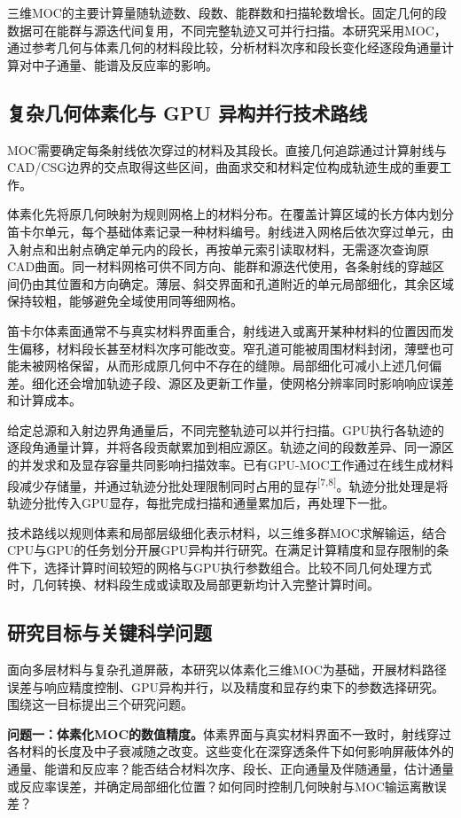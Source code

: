 \documentclass[UTF8, zihao=-4, fontset=none, a4paper]{ctexart}
\newcommand{\upcite}[1]{\textsuperscript{[#1]}}
\begin{document}
三维MOC的主要计算量随轨迹数、段数、能群数和扫描轮数增长。固定几何的段数据可在能群与源迭代间复用，不同完整轨迹又可并行扫描。本研究采用MOC，通过参考几何与体素几何的材料段比较，分析材料次序和段长变化经逐段角通量计算对中子通量、能谱及反应率的影响。

\subsection{复杂几何体素化与 GPU 异构并行技术路线}
MOC需要确定每条射线依次穿过的材料及其段长。直接几何追踪通过计算射线与CAD/CSG边界的交点取得这些区间，曲面求交和材料定位构成轨迹生成的重要工作。

体素化先将原几何映射为规则网格上的材料分布。在覆盖计算区域的长方体内划分笛卡尔单元，每个基础体素记录一种材料编号。射线进入网格后依次穿过单元，由入射点和出射点确定单元内的段长，再按单元索引读取材料，无需逐次查询原CAD曲面。同一材料网格可供不同方向、能群和源迭代使用，各条射线的穿越区间仍由其位置和方向确定。薄层、斜交界面和孔道附近的单元局部细化，其余区域保持较粗，能够避免全域使用同等细网格。

笛卡尔体素面通常不与真实材料界面重合，射线进入或离开某种材料的位置因而发生偏移，材料段长甚至材料次序可能改变。窄孔道可能被周围材料封闭，薄壁也可能未被网格保留，从而形成原几何中不存在的缝隙。局部细化可减小上述几何偏差。细化还会增加轨迹子段、源区及更新工作量，使网格分辨率同时影响响应误差和计算成本。

给定总源和入射边界角通量后，不同完整轨迹可以并行扫描。GPU执行各轨迹的逐段角通量计算，并将各段贡献累加到相应源区。轨迹之间的段数差异、同一源区的并发求和及显存容量共同影响扫描效率。已有GPU-MOC工作通过在线生成材料段减少存储量，并通过轨迹分批处理限制同时占用的显存\upcite{7,8}。轨迹分批处理是将轨迹分批传入GPU显存，每批完成扫描和通量累加后，再处理下一批。

技术路线以规则体素和局部层级细化表示材料，以三维多群MOC求解输运，结合CPU与GPU的任务划分开展GPU异构并行研究。在满足计算精度和显存限制的条件下，选择计算时间较短的网格与GPU执行参数组合。比较不同几何处理方式时，几何转换、材料段生成或读取及局部更新均计入完整计算时间。

\subsection{研究目标与关键科学问题}
面向多层材料与复杂孔道屏蔽，本研究以体素化三维MOC为基础，开展材料路径误差与响应精度控制、GPU异构并行，以及精度和显存约束下的参数选择研究。围绕这一目标提出三个研究问题。

\textbf{问题一：体素化MOC的数值精度。}体素界面与真实材料界面不一致时，射线穿过各材料的长度及中子衰减随之改变。这些变化在深穿透条件下如何影响屏蔽体外的通量、能谱和反应率？能否结合材料次序、段长、正向通量及伴随通量，估计通量或反应率误差，并确定局部细化位置？如何同时控制几何映射与MOC输运离散误差？
\end{document}
